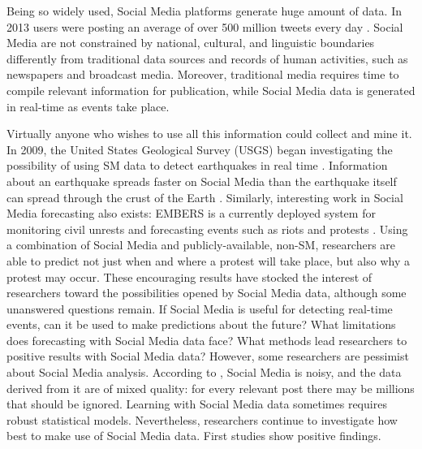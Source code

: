 \documentclass[]{book}
\begin{document}
Being so widely used, Social Media platforms generate huge amount of
data. In 2013 users were posting an average of over 500 million tweets
every day \citep{krikorian2013new}. Social Media are not constrained by
national, cultural, and linguistic boundaries differently from
traditional data sources and records of human activities, such as
newspapers and broadcast media. Moreover, traditional media requires
time to compile relevant information for publication, while Social Media
data is generated in real-time as events take place.

Virtually anyone who wishes to use all this information could collect
and mine it. In 2009, the United States Geological Survey (USGS) began
investigating the possibility of using SM data to detect earthquakes in
real time \citep{ellis2015usgs}. Information about an earthquake spreads
faster on Social Media than the earthquake itself can spread through the
crust of the Earth \citep{konkel2013tweets}. Similarly, interesting work
in Social Media forecasting also exists: EMBERS is a currently deployed
system for monitoring civil unrests and forecasting events such as riots
and protests \citep{ramakrishnan2014beating}. Using a combination of
Social Media and publicly-available, non-SM, researchers are able to
predict not just when and where a protest will take place, but also why
a protest may occur. These encouraging results have stocked the interest
of researchers toward the possibilities opened by Social Media data,
although some unanswered questions remain. If Social Media is useful for
detecting real-time events, can it be used to make predictions about the
future? What limitations does forecasting with Social Media data face?
What methods lead researchers to positive results with Social Media
data? However, some researchers are pessimist about Social Media
analysis. According to \citep{ruths2014social, weller2015accepting},
Social Media is noisy, and the data derived from it are of mixed
quality: for every relevant post there may be millions that should be
ignored. Learning with Social Media data sometimes requires robust
statistical models. Nevertheless, researchers continue to investigate
how best to make use of Social Media data. First studies show positive
findings.
\end{document}
